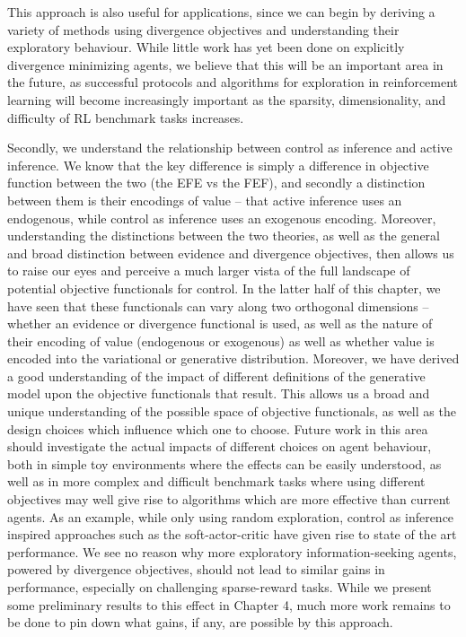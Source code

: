 This approach is also useful for applications, since we can begin by deriving a variety of methods using divergence objectives and understanding their exploratory behaviour. While little work has yet been done on explicitly divergence minimizing agents, we believe that this will be an important area in the future, as successful protocols and algorithms for exploration in reinforcement learning will become increasingly important as the sparsity, dimensionality, and difficulty of RL benchmark tasks increases.

Secondly, we understand the relationship between control as inference and active inference. We know that the key difference is simply a difference in objective function between the two (the EFE vs the FEF), and secondly a distinction between them is their encodings of value -- that active inference uses an endogenous, while control as inference uses an exogenous encoding. Moreover, understanding the distinctions between the two theories, as well as the general and broad distinction between evidence and divergence objectives, then allows us to raise our eyes and perceive a much larger vista of the full landscape of potential objective functionals for control. In the latter half of this chapter, we have seen that these functionals can vary along two orthogonal dimensions -- whether an evidence or divergence functional is used, as well as the nature of their encoding of value (endogenous or exogenous) as well as whether value is encoded into the variational or generative distribution. Moreover, we have derived a good understanding of the impact of different definitions of the generative model upon the objective functionals that result. This allows us a broad and unique understanding of the possible space of objective functionals, as well as the design choices which influence which one to choose. Future work in this area should investigate the actual impacts of different choices on agent behaviour, both in simple toy environments where the effects can be easily understood, as well as in more complex and difficult benchmark tasks where using different objectives may well give rise to algorithms which are more effective than current agents. As an example, while only using random exploration, control as inference inspired approaches such as the soft-actor-critic have given rise to state of the art performance. We see no reason why more exploratory information-seeking agents, powered by divergence objectives, should not lead to similar gains in performance, especially on challenging sparse-reward tasks. While we present some preliminary results to this effect in Chapter 4, much more work remains to be done to pin down what gains, if any, are possible by this approach.

